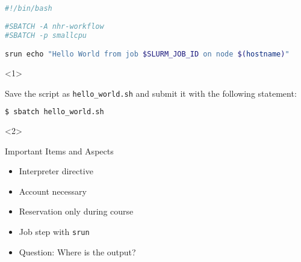 \begin{frame}[fragile]
	\setcounter{handson}{\value{preframe_handson}}
	\frametitle{}
	\vspace{-2em}
	\begin{minipage}[t][0.32\textheight][t]{1.0\linewidth}
		\begin{lstlisting}[language=Bash, style=Shell, basicstyle=\scriptsize]
#!/bin/bash
			
#SBATCH -A nhr-workflow
#SBATCH -p smallcpu

srun echo "Hello World from job $SLURM_JOB_ID on node $(hostname)"
		\end{lstlisting}
	\end{minipage}\newline
	\begin{minipage}[t][0.3\textheight][t]{1.0\linewidth}
		\begin{onlyenv}<1>
			\begin{task}
				Save the script as \texttt{hello\_world.sh} and submit it with the following statement:
			\end{task}
			\begin{lstlisting}[language=Bash, style=Shell, basicstyle=\footnotesize]
$ sbatch hello_world.sh
			\end{lstlisting}
		\end{onlyenv}
		\begin{onlyenv}<2>
			\begin{block}{Important Items and Aspects}
				\begin{itemize}
					\item Interpreter directive
					\item Account necessary
					\item Reservation only during course
					\item Job step with \texttt{srun}
					\item Question: Where is the output?
				\end{itemize}
			\end{block}
		\end{onlyenv}
	\end{minipage}
	\vfill
\end{frame}
